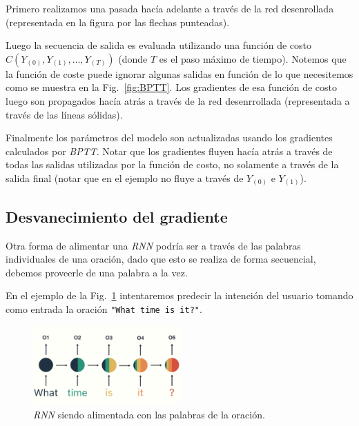 \documentclass[a4paper,12pt]{article}
\begin{document}
Primero realizamos una pasada hacía adelante a través de la red desenrollada (representada en la figura por las flechas punteadas). 

Luego la secuencia de salida es evaluada utilizando una función de costo $C(Y_{(0)}, Y_{(1)}, \dots, Y_{(T)})$ (donde $T$ es el paso máximo de tiempo). Notemos que la función de coste puede ignorar algunas salidas en función de lo que necesitemos como se muestra en la Fig.~\ref{fig:BPTT}.
Los gradientes de esa función de costo luego son propagados hacía atrás a través de la red desenrrollada (representada a través de las líneas sólidas).

Finalmente los parámetros del modelo son actualizadas usando los gradientes calculados por \textit{BPTT}. Notar que los gradientes fluyen hacía atrás a través de todas las salidas utilizadas por la función de costo, no solamente a través de la salida final (notar que en el ejemplo no fluye a través de $Y_{(0)}$ e $Y_{(1)}$).

\subsection{Desvanecimiento del gradiente}

Otra forma de alimentar una \textit{RNN} podría ser a través de las palabras individuales de una oración, dado que esto se realiza de forma secuencial, debemos proveerle de una palabra a la vez.

En el ejemplo de la Fig.~\ref{fig:rnnvanishing1} intentaremos predecir la intención del usuario tomando como entrada la oración \texttt{"What time is it?"}\citep{phi:rnn}.

\begin{figure}[H]
	\begin{center}				
		\includegraphics[width=0.5\textwidth]{vanishing1.png}
		\caption{\textit{RNN} siendo alimentada con las palabras de la oración. \citep{phi:rnn}}
		\label{fig:rnnvanishing1}
	\end{center}
\end{figure}
\end{document}
